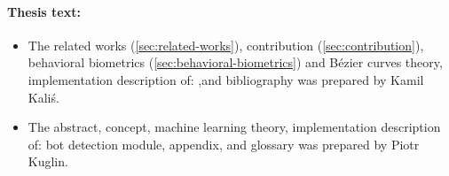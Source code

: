 \paragraph{Thesis text:}
\begin{itemize}[label=$\bullet$]
    \item The related works (\ref{sec:related-works}), contribution (\ref{sec:contribution}), behavioral biometrics (\ref{sec:behavioral-biometrics}) and Bézier curves theory, implementation description of: ,and bibliography was prepared by Kamil Kaliś.
    \item The abstract, concept, machine learning theory, implementation description of: bot detection module, appendix, and glossary was prepared by Piotr Kuglin.
\end{itemize}